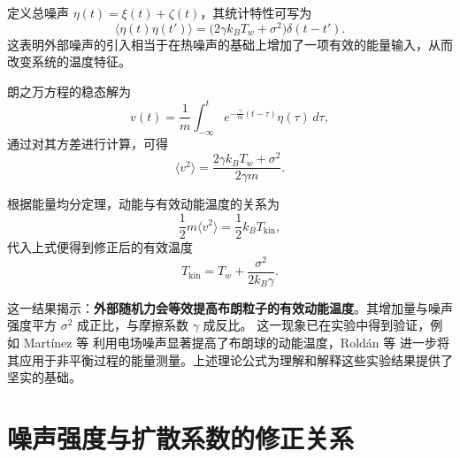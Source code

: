 \documentclass[a4paper]{report} %
\begin{document}
定义总噪声 $\eta(t) = \xi(t) + \zeta(t)$，其统计特性可写为
\begin{equation}
\langle \eta(t)\eta(t') \rangle = \big( 2\gamma k_B T_w + \sigma^2 \big)\delta(t - t').
\end{equation}
这表明外部噪声的引入相当于在热噪声的基础上增加了一项有效的能量输入，从而改变系统的温度特征。  

朗之万方程的稳态解为
\begin{equation}
v(t) = \frac{1}{m} \int_{-\infty}^{t} e^{-\frac{\gamma}{m}(t-\tau)} \eta(\tau) \, d\tau,
\end{equation}
通过对其方差进行计算，可得
\begin{equation}
\langle v^2 \rangle = \frac{2\gamma k_B T_w + \sigma^2}{2\gamma m}.
\end{equation}

根据能量均分定理，动能与有效动能温度的关系为
\begin{equation}
\frac{1}{2} m \langle v^2 \rangle = \frac{1}{2} k_B T_{\text{kin}},
\end{equation}
代入上式便得到修正后的有效温度
\begin{equation}
T_{\text{kin}} = T_w + \frac{\sigma^2}{2k_B \gamma}.
\label{eq:Teff}
\end{equation}\par
这一结果揭示：\textbf{外部随机力会等效提高布朗粒子的有效动能温度}。其增加量与噪声强度平方 $\sigma^2$ 成正比，与摩擦系数 $\gamma$ 成反比。
这一现象已在实验中得到验证，例如 Martínez 等 \cite{Martinez2013} 利用电场噪声显著提高了布朗球的动能温度，Roldán 等 \cite{Roldan2014}
进一步将其应用于非平衡过程的能量测量。上述理论公式为理解和解释这些实验结果提供了坚实的基础。
\section{噪声强度与扩散系数的修正关系}\par
\end{document}
